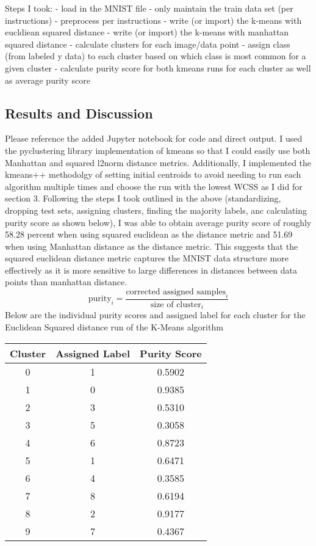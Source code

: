 \documentclass[twoside,10pt]{article}
\begin{document}
Steps I took:
- load in the MNIST file
- only maintain the train data set (per instructions)
- preprocess per instructions
- write (or import) the k-means with eucldiean squared distance
- write (or import) the k-means with manhattan squared distance
- calculate clusters for each image/data point
- assign class (from labeled y data) to each cluster based on which class is most common for a given cluster
- calculate purity score for both kmeans runs for each cluster as well as average purity score

\subsection{Results and Discussion}
Please reference the added Jupyter notebook for code and direct output. I used the pyclustering library
implementation of kmeans so that I could easily use both Manhattan and squared l2norm distance metrics.
Additionally, I implemented the kmeans++ methodolgy of setting initial centroids to avoid needing to run each
algorithm multiple times and choose the run with the lowest WCSS as I did for section 3. Following the steps
I took outlined in the above (standardizing, dropping test sets, assigning clusters, finding the majority
labels, anc calculating purity score as shown below), I was able to obtain average purity score of roughly 58.28
percent when using squared euclidean as the distance metric and 51.69 when using Manhattan distance as the distance
metric. This suggests that the squared euclidean distance metric captures the MNIST data structure more effectively
as it is more sensitive to large differences in distances between data points than manhattan distance.
\[
\mbox{purity}_i = \frac{\mbox{corrected assigned samples}_i}{\mbox{size of cluster}_i}
\]
Below are the individual purity scores and assigned label for each cluster for the Euclidean Squared distance
run of the K-Means algorithm


\begin{tabular}{|c|c|c|}
\hline
\textbf{Cluster} & \textbf{Assigned Label} & \textbf{Purity Score} \\
\hline
0 & 1 & 0.5902 \\
\hline
1 & 0 & 0.9385 \\
\hline
2 & 3 & 0.5310 \\
\hline
3 & 5 & 0.3058 \\
\hline
4 & 6 & 0.8723 \\
\hline
5 & 1 & 0.6471 \\
\hline
6 & 4 & 0.3585 \\
\hline
7 & 8 & 0.6194 \\
\hline
8 & 2 & 0.9177 \\
\hline
9 & 7 & 0.4367 \\
\hline
\end{tabular}
\end{document}
